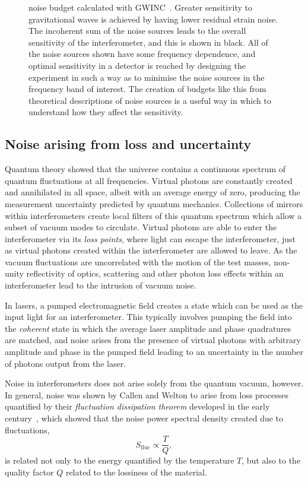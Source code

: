 \begin{figure}
  \centering
  
  \caption[Advanced LIGO noise budget]{\label{fig:aligo-noise-budget}\ALIGO{} noise budget calculated with \gls{GWINC}~\cite{gwinc}. Greater sensitivity to gravitational waves is achieved by having lower residual strain noise. The incoherent sum of the noise sources leads to the overall sensitivity of the interferometer, and this is shown in black. All of the noise sources shown have some frequency dependence, and optimal sensitivity in a detector is reached by designing the experiment in such a way as to minimise the noise sources in the frequency band of interest. The creation of budgets like this from theoretical descriptions of noise sources is a useful way in which to understand how they affect the sensitivity.}
\end{figure}

\subsection{\label{sec:noise-via-loss}Noise arising from loss and uncertainty}
Quantum theory showed that the universe contains a continuous spectrum of quantum fluctuations at all frequencies. Virtual photons are constantly created and annihilated in all space, albeit with an average energy of zero, producing the measurement uncertainty predicted by quantum mechanics. Collections of mirrors within interferometers create local filters of this quantum spectrum which allow a subset of vacuum modes to circulate. Virtual photons are able to enter the interferometer via its \emph{loss points}, where light can escape the interferometer, just as virtual photons created within the interferometer are allowed to leave. As the vacuum fluctuations are uncorrelated with the motion of the test masses, non-unity reflectivity of optics, scattering and other photon loss effects within an interferometer lead to the intrusion of vacuum noise.

In lasers, a pumped electromagnetic field creates a state which can be used as the input light for an interferometer. This typically involves pumping the field into the \emph{coherent} state in which the average laser amplitude and phase quadratures are matched, and noise arises from the presence of virtual photons with arbitrary amplitude and phase in the pumped field leading to an uncertainty in the number of photons output from the laser.

Noise in interferometers does not arise solely from the quantum vacuum, however. In general, noise was shown by Callen and Welton to arise from loss processes quantified by their \emph{fluctuation dissipation theorem} developed in the early  century~\cite{Callen1951}, which showed that the noise power spectral density created due to fluctuations,
\begin{equation}
  S_{\text{fluc}} \propto \frac{T}{Q},
\end{equation}
is related not only to the energy quantified by the temperature $T$, but also to the quality factor $Q$ related to the lossiness of the material.

